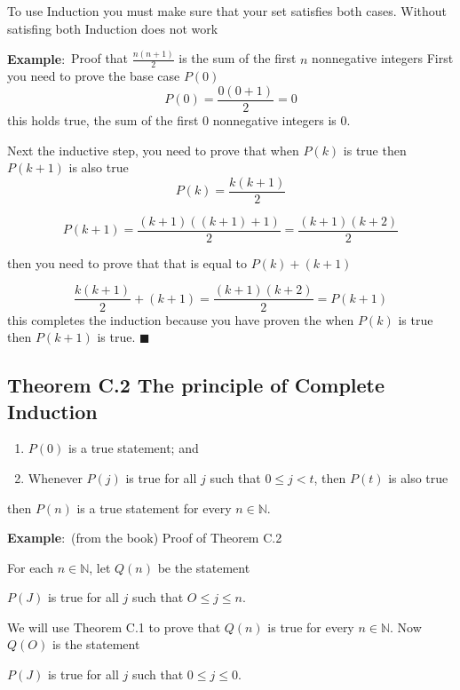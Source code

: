 \documentclass{article}
\begin{document}
To use Induction you must make sure that your set satisfies both cases. Without satisfing both Induction does not work

\textbf{Example$\colon$} Proof that $\frac{n(n+1)}{2}$ is the sum of the first $n$ nonnegative integers
First you need to prove the base case $P(0)$
\begin{equation}
    P(0) = \frac{0(0+1)}{2} = 0
\end{equation}
this holds true, the sum of the first 0 nonnegative integers is 0.

Next the inductive step, you need to prove that when $P(k)$ is true then $P(k+1)$ is also true
\begin{equation}
    P(k) = \frac{k(k+1)}{2}
\end{equation}

\begin{equation}
    P(k+1) = \frac{(k+1)((k+1)+1)}{2} = \frac{(k+1)(k+2)}{2}
\end{equation}

then you need to prove that that is equal to $P(k) + (k+1)$

\begin{equation}
    \frac{k(k+1)}{2} + (k+1) = \frac{(k+1)(k+2)}{2} = P(k+1)
\end{equation}
this completes the induction because you have proven the when $P(k)$ is true then $P(k+1)$ is true. $\blacksquare$

\subsection*{Theorem C.2 The principle of Complete Induction}

\begin{enumerate}
    \item $P(0)$ is a true statement; and
    \item Whenever $P(j)$ is true for all $j$ such that $0 \leq j < t$, then $P(t)$ is also true
\end{enumerate}
then $P(n)$ is a true statement for every $n \in \mathbb{N}$.

\textbf{Example$\colon$} (from the book) Proof of Theorem C.2

For each $n \in \mathbb{N}$, let $Q(n)$ be the statement
\begin{center}
$P(J)$ is true for all $j$ such that $O \leq j \leq n$.
\end{center}
We will use Theorem C.1 to prove that $Q(n)$ is true for every $n \in \mathbb{N}$.
Now $Q(O)$ is the statement
\begin{center}
    $P(J)$ is true for all $j$ such that $0 \leq j \leq 0$. 
\end{center}
\end{document}
